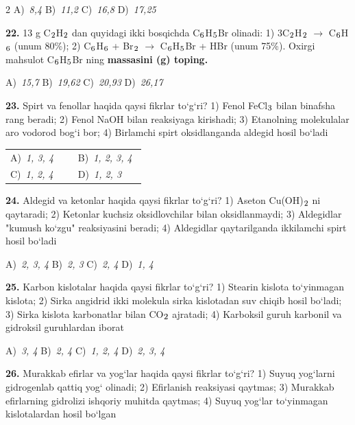 \documentclass[11pt,a4paper]{article}
\renewcommand{\textsubscript}[1]{\ensuremath{_{\text{\fontsize{8}{8}\selectfont #1}}}}
\begin{document}
\begin{multicols}{2}
\noindent A)~\textsl{8,4} \hfill B)~\textsl{11,2} \hfill C)~\textsl{16,8} \hfill D)~\textsl{17,25}\par
\vspace{4pt}
\noindent\textbf{22.} 13 g C\textsubscript{2}H\textsubscript{2} dan quyidagi ikki bosqichda C\textsubscript{6}H\textsubscript{5}Br olinadi: 1) 3C\textsubscript{2}H\textsubscript{2} $\to$ C\textsubscript{6}H\textsubscript{6} (unum 80\%); 2) C\textsubscript{6}H\textsubscript{6} + Br\textsubscript{2} $\to$ C\textsubscript{6}H\textsubscript{5}Br + HBr (unum 75\%). Oxirgi mahsulot C\textsubscript{6}H\textsubscript{5}Br ning \textbf{massasini (g) toping.}

\noindent A)~\textsl{15,7} \hfill B)~\textsl{19,62} \hfill C)~\textsl{20,93} \hfill D)~\textsl{26,17}\par
\vspace{4pt}
\noindent\textbf{23.} Spirt va fenollar haqida qaysi fikrlar to`g`ri? 1) Fenol FeCl\textsubscript{3} bilan binafsha rang beradi; 2) Fenol NaOH bilan reaksiyaga kirishadi; 3) Etanolning molekulalar aro vodorod bog`i bor; 4) Birlamchi spirt oksidlanganda aldegid hosil bo`ladi

\noindent\begin{tabular}{@{}p{0.47\linewidth}@{}p{0.47\linewidth}@{}}
A)~\textsl{1, 3, 4} & B)~\textsl{1, 2, 3, 4} \\
C)~\textsl{1, 2, 4} & D)~\textsl{1, 2, 3} \\
\end{tabular}\par
\vspace{4pt}
\noindent\textbf{24.} Aldegid va ketonlar haqida qaysi fikrlar to`g`ri? 1) Aseton Cu(OH)\textsubscript{2} ni qaytaradi; 2) Ketonlar kuchsiz oksidlovchilar bilan oksidlanmaydi; 3) Aldegidlar "kumush ko`zgu" reaksiyasini beradi; 4) Aldegidlar qaytarilganda ikkilamchi spirt hosil bo`ladi

\noindent A)~\textsl{2, 3, 4} \hfill B)~\textsl{2, 3} \hfill C)~\textsl{2, 4} \hfill D)~\textsl{1, 4}\par
\vspace{4pt}
\noindent\textbf{25.} Karbon kislotalar haqida qaysi fikrlar to`g`ri? 1) Stearin kislota to`yinmagan kislota; 2) Sirka angidrid ikki molekula sirka kislotadan suv chiqib hosil bo`ladi; 3) Sirka kislota karbonatlar bilan CO\textsubscript{2} ajratadi; 4) Karboksil guruh karbonil va gidroksil guruhlardan iborat

\noindent A)~\textsl{3, 4} \hfill B)~\textsl{2, 4} \hfill C)~\textsl{1, 2, 4} \hfill D)~\textsl{2, 3, 4}\par
\vspace{4pt}
\noindent\textbf{26.} Murakkab efirlar va yog`lar haqida qaysi fikrlar to`g`ri? 1) Suyuq yog`larni gidrogenlab qattiq yog` olinadi; 2) Efirlanish reaksiyasi qaytmas; 3) Murakkab efirlarning gidrolizi ishqoriy muhitda qaytmas; 4) Suyuq yog`lar to`yinmagan kislotalardan hosil bo`lgan


\end{multicols}
\end{document}
